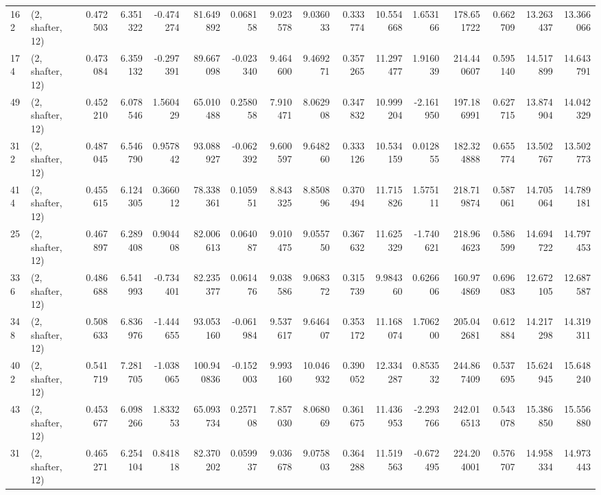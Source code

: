 \begin{tabular}{llrrrrrrrrrrrrrr}
162 &  (2, shafter, 12) &   0.472503 &   6.351322 &  -0.474274 &    81.649892 &   0.068158 &   9.023578 &   9.036033 &  0.333774 &  10.554668 &   1.653166 &   178.651722 &   0.662709 &  13.263437 &  13.366066 \\
174 &  (2, shafter, 12) &   0.473084 &   6.359132 &  -0.297391 &    89.667098 &  -0.023340 &   9.464600 &   9.469271 &  0.357265 &  11.297477 &   1.916039 &   214.440607 &   0.595140 &  14.517899 &  14.643791 \\
49  &  (2, shafter, 12) &   0.452210 &   6.078546 &   1.560429 &    65.010488 &   0.258058 &   7.910471 &   8.062908 &  0.347832 &  10.999204 &  -2.161950 &   197.186991 &   0.627715 &  13.874904 &  14.042329 \\
312 &  (2, shafter, 12) &   0.487045 &   6.546790 &   0.957842 &    93.088927 &  -0.062392 &   9.600597 &   9.648260 &  0.333126 &  10.534159 &   0.012855 &   182.324888 &   0.655774 &  13.502767 &  13.502773 \\
414 &  (2, shafter, 12) &   0.455615 &   6.124305 &   0.366012 &    78.338361 &   0.105951 &   8.843325 &   8.850896 &  0.370494 &  11.715826 &   1.575111 &   218.719874 &   0.587061 &  14.705064 &  14.789181 \\
25  &  (2, shafter, 12) &   0.467897 &   6.289408 &   0.904408 &    82.006613 &   0.064087 &   9.010475 &   9.055750 &  0.367632 &  11.625329 &  -1.740621 &   218.964623 &   0.586599 &  14.694722 &  14.797453 \\
336 &  (2, shafter, 12) &   0.486688 &   6.541993 &  -0.734401 &    82.235377 &   0.061476 &   9.038586 &   9.068372 &  0.315739 &   9.984360 &   0.626606 &   160.974869 &   0.696083 &  12.672105 &  12.687587 \\
348 &  (2, shafter, 12) &   0.508633 &   6.836976 &  -1.444655 &    93.053160 &  -0.061984 &   9.537617 &   9.646407 &  0.353172 &  11.168074 &   1.706200 &   205.042681 &   0.612884 &  14.217298 &  14.319311 \\
402 &  (2, shafter, 12) &   0.541719 &   7.281705 &  -1.038065 &   100.940836 &  -0.152003 &   9.993160 &  10.046932 &  0.390052 &  12.334287 &   0.853532 &   244.867409 &   0.537695 &  15.624945 &  15.648240 \\
43  &  (2, shafter, 12) &   0.453677 &   6.098266 &   1.833253 &    65.093734 &   0.257108 &   7.857030 &   8.068069 &  0.361675 &  11.436953 &  -2.293766 &   242.016513 &   0.543078 &  15.386850 &  15.556880 \\
31  &  (2, shafter, 12) &   0.465271 &   6.254104 &   0.841818 &    82.370202 &   0.059937 &   9.036678 &   9.075803 &  0.364288 &  11.519563 &  -0.672495 &   224.204001 &   0.576707 &  14.958334 &  14.973443 \\

\end{tabular}
